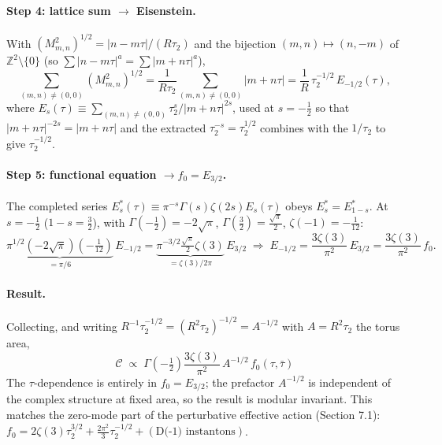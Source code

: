 \paragraph{Step 4: lattice sum $\to$ Eisenstein.}
With $(M_{m,n}^2)^{1/2} = |n-m\tau|/(R\tau_2)$ and the bijection $(m,n)\mapsto(n,-m)$ of
$\mathbb{Z}^2\setminus\{0\}$ (so $\sum|n-m\tau|^a = \sum|m+n\tau|^a$),
\begin{equation}
\sum_{(m,n)\neq(0,0)} (M_{m,n}^2)^{1/2}
= \frac{1}{R\tau_2}\sum_{(m,n)\neq(0,0)} |m+n\tau|
= \frac{1}{R}\,\tau_2^{-1/2}\, E_{-1/2}(\tau),
\end{equation}
where $E_s(\tau)\equiv\sum_{(m,n)\neq(0,0)}\tau_2^{s}/|m+n\tau|^{2s}$, used at $s=-\tfrac12$ so that
$|m+n\tau|^{-2s}=|m+n\tau|$ and the extracted $\tau_2^{-s}=\tau_2^{1/2}$ combines with the $1/\tau_2$
to give $\tau_2^{-1/2}$.

\paragraph{Step 5: functional equation $\to f_0=E_{3/2}$.}
The completed series $E_s^\ast(\tau)\equiv\pi^{-s}\Gamma(s)\zeta(2s)E_s(\tau)$ obeys $E_s^\ast=E_{1-s}^\ast$.
At $s=-\tfrac12$ ($1-s=\tfrac32$), with $\Gamma(-\tfrac12)=-2\sqrt\pi$, $\Gamma(\tfrac32)=\tfrac{\sqrt\pi}{2}$, $\zeta(-1)=-\tfrac{1}{12}$:
\begin{equation}
\underbrace{\pi^{1/2}(-2\sqrt\pi)(-\tfrac{1}{12})}_{=\pi/6}\,E_{-1/2}
= \underbrace{\pi^{-3/2}\tfrac{\sqrt\pi}{2}\zeta(3)}_{=\zeta(3)/2\pi}\,E_{3/2}
\;\Rightarrow\;
E_{-1/2} = \frac{3\zeta(3)}{\pi^2}\,E_{3/2} = \frac{3\zeta(3)}{\pi^2}\, f_0 .
\end{equation}

\paragraph{Result.}
Collecting, and writing $R^{-1}\tau_2^{-1/2}=(R^2\tau_2)^{-1/2}=A^{-1/2}$ with $A=R^2\tau_2$ the torus area,
\begin{equation}
\boxed{\;\mathcal{C} \;\propto\; \Gamma\!\left(-\tfrac12\right)\frac{3\zeta(3)}{\pi^2}\, A^{-1/2}\, f_0(\tau,\bar\tau)\;}
\end{equation}
The $\tau$-dependence is entirely in $f_0=E_{3/2}$; the prefactor $A^{-1/2}$ is independent of the
complex structure at fixed area, so the result is modular invariant.
This matches the zero-mode part of the perturbative effective action (Section 7.1):
$f_0 = 2\zeta(3)\tau_2^{3/2}+\tfrac{2\pi^2}{3}\tau_2^{-1/2}+(\text{D(-1) instantons})$.

